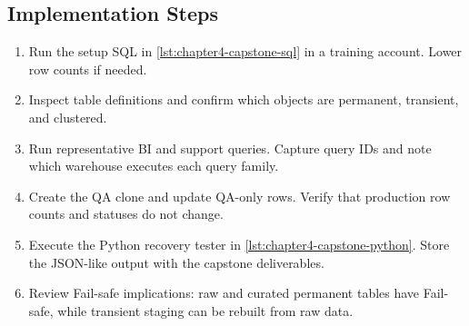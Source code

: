 \subsection*{Implementation Steps}
\begin{enumerate}
    \item Run the setup SQL in \cref{lst:chapter4-capstone-sql} in a training account. Lower row counts if needed.
    \item Inspect table definitions and confirm which objects are permanent, transient, and clustered.
    \item Run representative BI and support queries. Capture query IDs and note which warehouse executes each query family.
    \item Create the QA clone and update QA-only rows. Verify that production row counts and statuses do not change.
    \item Execute the Python recovery tester in \cref{lst:chapter4-capstone-python}. Store the JSON-like output with the capstone deliverables.
    \item Review Fail-safe implications: raw and curated permanent tables have Fail-safe, while transient staging can be rebuilt from raw data.
\end{enumerate}
